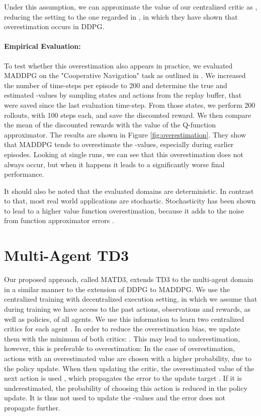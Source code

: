 \documentclass{article}
\begin{document}
Under this assumption, we can approximate the value of our centralized critic as , reducing the setting to the one regarded in \cite{Fujimoto2018}, in which they have shown that overestimation occurs in \gls*{DDPG}.
\paragraph{Empirical Evaluation:}

To test whether this overestimation also appears in practice, we evaluated \gls*{MADDPG} on the "Cooperative Navigation" task as outlined in \cite{Lowe2017}.
We increased the number of time-steps per episode to 200 and determine the true and estimated -values by sampling states and actions from the replay buffer, that were saved since the last evaluation time-step.
From those states, we perform 200 rollouts, with 100 steps each, and save the discounted reward.
We then compare the mean of the discounted rewards with the value of the Q-function approximator.
The results are shown in Figure \ref{fig:overestimation}. 
They show that \gls*{MADDPG} tends to overestimate the -values, especially during earlier episodes.
Looking at single runs, we can see that this overestimation does not always occur, but when it happens it leads to a significantly worse final performance.

It should also be noted that the evaluated domains are deterministic. 
In contrast to that, most real world applications are stochastic.
Stochasticity has been shown to lead to a higher value function overestimation, because it adds to the noise from function approximator errors \cite{VanHasselt2010}.

\section{Multi-Agent TD3}
\label{sec:approach}
Our proposed approach, called \gls*{MATD3}, extends TD3 to the multi-agent domain in a similar manner to the extension of \gls*{DDPG} to \gls*{MADDPG}.
We use the centralized training with decentralized execution setting, in which we assume that during training we have access to the past actions, observations and rewards, as well as policies, of all agents.
We use this information to learn two centralized critics  for each agent .
In order to reduce the overestimation bias, we update them with the minimum of both critics: .
This may lead to underestimation, however, this is preferable to overestimation:
In the case of overestimation, actions with an overestimated value are chosen with a higher probability, due to the policy update.
When then updating the critic, the overestimated value of the next action  is used , which propagates the error to the update target .
If it is underestimated, the probability of choosing this action is reduced in the policy update. 
It is thus not used to update the -values and the error does not propagate further.
\end{document}
